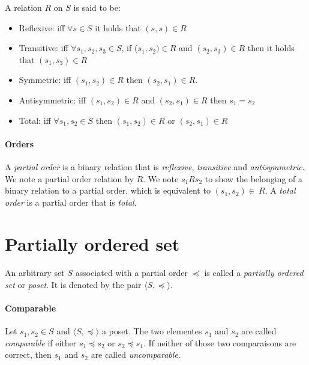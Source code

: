 \documentclass[letterpaper]{memoir}
\begin{document}
A relation $R$ on $S$ is said to be:

\begin{itemize}
    \item Reflexive:
    iff $\forall s \in S$ it holds that $(s, s) \in R$
    \item Transitive:
    iff $\forall s_1, s_2, s_3 \in S$,
    if ($s_1, s_2) \in R$ and $(s_2, s_3) \in R$
    then it holds that $(s_1, s_3) \in R$
    \item Symmetric: iff $(s_1, s_2) \in R$ then $(s_2, s_1) \in R$.
    \item Antisymmetric: iff $(s_1, s_2) \in R$
    and $(s_2, s_1) \in R$ then $s_1 = s_2$
    \item Total: iff $\forall s_1, s_2 \in S$ then $(s_1, s_2) \in R$
    or $(s_2, s_1) \in R$

\end{itemize}

\paragraph{Orders}

A \textit{partial order} is a binary relation that is \textit{reflexive},
\textit{transitive} and \textit{antisymmetric}. We note a
partial order relation by $R$.
We note $s_1 R  s_2$ to show the belonging of
a binary relation to a partial order, which is equivalent
to $(s_1, s_2) \in \ R$.
A \textit{total order} is a partial order that is \textit{total}.

\section{Partially ordered set}

\paragraph{}

An arbitrary set $S$ associated with a partial order $\preceq$
is called a \textit{partially ordered set} or \textit{poset}.
It is denoted by the pair $\langle S, \preceq \rangle$.

\paragraph{Comparable}

Let $s_1, s_2 \in S$ and $\langle S, \preceq \rangle$ a poset.
The two elementes $s_1$ and $s_2$ are called \textit{comparable} if either
$s_1 \preceq s_2$ or $s_2 \preceq s_1$. If neither of those two comparaisons
are correct, then $s_1$ and $s_2$ are called \textit{uncomparable}.
\end{document}
